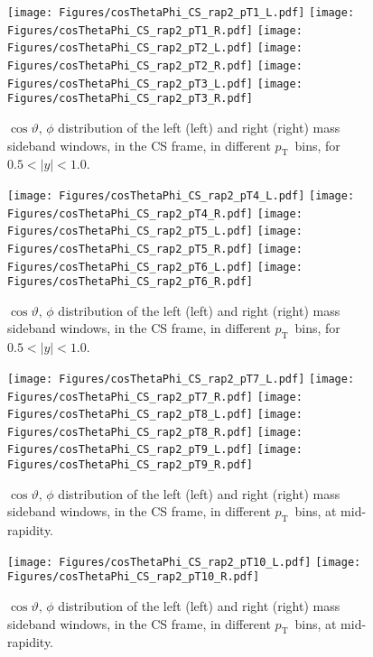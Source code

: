\documentclass[12pt]{article}
\newcommand{\pt}{$p_{\mathrm{T}}$}
\begin{document}
\begin{figure}[htbp]
\centering
\texttt{[image: Figures/cosThetaPhi\_CS\_rap2\_pT1\_L.pdf]}
\texttt{[image: Figures/cosThetaPhi\_CS\_rap2\_pT1\_R.pdf]}
\texttt{[image: Figures/cosThetaPhi\_CS\_rap2\_pT2\_L.pdf]}
\texttt{[image: Figures/cosThetaPhi\_CS\_rap2\_pT2\_R.pdf]}
\texttt{[image: Figures/cosThetaPhi\_CS\_rap2\_pT3\_L.pdf]}
\texttt{[image: Figures/cosThetaPhi\_CS\_rap2\_pT3\_R.pdf]}
\caption{$\cos\vartheta,\,\phi$ distribution of the left (left) and
  right (right) mass sideband windows, in the CS frame, in different
  \pt\ bins, for $0.5 < |y| < 1.0$.}
\end{figure}
\clearpage

\begin{figure}[htbp]
\centering
\texttt{[image: Figures/cosThetaPhi\_CS\_rap2\_pT4\_L.pdf]}
\texttt{[image: Figures/cosThetaPhi\_CS\_rap2\_pT4\_R.pdf]}
\texttt{[image: Figures/cosThetaPhi\_CS\_rap2\_pT5\_L.pdf]}
\texttt{[image: Figures/cosThetaPhi\_CS\_rap2\_pT5\_R.pdf]}
\texttt{[image: Figures/cosThetaPhi\_CS\_rap2\_pT6\_L.pdf]}
\texttt{[image: Figures/cosThetaPhi\_CS\_rap2\_pT6\_R.pdf]}
\caption{$\cos\vartheta,\,\phi$ distribution of the left (left) and
  right (right) mass sideband windows, in the CS frame, in different
  \pt\ bins, for $0.5 < |y| < 1.0$.} 
\end{figure}
\clearpage

\begin{figure}[htbp]
\centering
\texttt{[image: Figures/cosThetaPhi\_CS\_rap2\_pT7\_L.pdf]}
\texttt{[image: Figures/cosThetaPhi\_CS\_rap2\_pT7\_R.pdf]}
\texttt{[image: Figures/cosThetaPhi\_CS\_rap2\_pT8\_L.pdf]}
\texttt{[image: Figures/cosThetaPhi\_CS\_rap2\_pT8\_R.pdf]}
\texttt{[image: Figures/cosThetaPhi\_CS\_rap2\_pT9\_L.pdf]}
\texttt{[image: Figures/cosThetaPhi\_CS\_rap2\_pT9\_R.pdf]}
\caption{$\cos\vartheta,\,\phi$ distribution of the left (left) and
  right (right) mass sideband windows, in the CS frame, in different
  \pt\ bins, at mid-rapidity.}
\end{figure}
\clearpage

\begin{figure}[htbp]
\centering
\texttt{[image: Figures/cosThetaPhi\_CS\_rap2\_pT10\_L.pdf]}
\texttt{[image: Figures/cosThetaPhi\_CS\_rap2\_pT10\_R.pdf]}
\caption{$\cos\vartheta,\,\phi$ distribution of the left (left) and
  right (right) mass sideband windows, in the CS frame, in different
  \pt\ bins, at mid-rapidity.} 
\end{figure}
\clearpage
\end{document}
